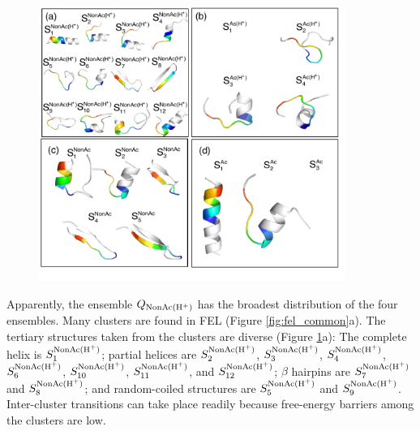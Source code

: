 \begin{figure}
  \centering
  \includegraphics[width=10cm]{../single_CTD/figures_p53ctd/10.pdf}
  \caption{\label{fig:repre_confs_comm_fel}}
\end{figure}

Apparently, the ensemble $Q_{\rm NonAc(H^+)}$ has the broadest distribution of the four ensembles. 
Many clusters are found in FEL (Figure \ref{fig:fel_common}a). 
The tertiary structures taken from the clusters are diverse (Figure \ref{fig:repre_confs_comm_fel}a): 
The complete helix is $S_1^{\rm NonAc(H^+)}$; 
partial helices are $S_2^{\rm NonAc(H^+)}$, $S_3^{\rm NonAc(H^+)}$, $S_4^{\rm NonAc(H^+)}$, $S_6^{\rm NonAc(H^+)}$, $S_{10}^{\rm NonAc(H^+)}$, $S_{11}^{\rm NonAc(H^+)}$, and $S_{12}^{\rm NonAc(H^+)}$; 
$\beta$ hairpins are $S_7^{\rm NonAc(H^+)}$ and $S_8^{\rm NonAc(H^+)}$; and random-coiled structures are $S_5^{\rm NonAc(H^+)}$ and $S_9^{\rm NonAc(H^+)}$. 
Inter-cluster transitions can take place readily because free-energy barriers among the clusters are low.

